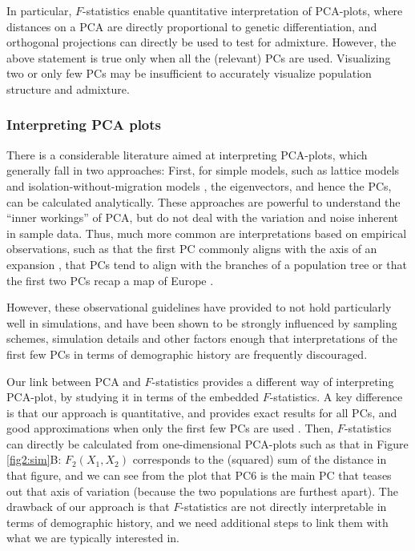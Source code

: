 \documentclass[12pt]{article}
\begin{document}
In particular, $F$-statistics enable quantitative interpretation of PCA-plots, where distances on a PCA are directly proportional to genetic differentiation, and orthogonal projections can directly be used to test for admixture.
However, the above statement is true only when all the (relevant) PCs are used. Visualizing two or only few PCs may be insufficient to accurately visualize population structure and admixture. 

\subsubsection{Interpreting PCA plots}
There is a considerable literature aimed at interpreting PCA-plots, which generally fall in two approaches: First, for simple models, such as lattice models \citep{novembre_interpreting_2008} and isolation-without-migration models \citep{mcvean_genealogical_2009}, the eigenvectors, and hence the PCs, can be calculated analytically. These approaches are powerful to understand the ``inner workings'' of PCA, but do not deal with the variation and noise inherent in sample data. Thus, much more common are interpretations based on empirical observations, such as that the first PC commonly aligns with the axis of an expansion \citep{l_l_cavalli-sforza_history_1996}, that PCs tend to align with the branches of a population tree or that the first two PCs recap a map of Europe \citep{novembre_genes_2008, cavalli-sforza_analysis_1975}.

However, these observational guidelines have provided to not hold particularly well in simulations, and have been shown to be strongly influenced by sampling schemes, simulation details and other factors \citep{novembre_interpreting_2008, degiorgio_geographic_2013, elhaik_principal_2022, jay_anisotropic_2013} enough that interpretations of the first few PCs in terms of demographic history are frequently discouraged.

Our link between PCA and $F$-statistics provides a different way of interpreting PCA-plot, by studying it in terms of the embedded $F$-statistics. A key difference is that our approach is quantitative, and provides exact results for all PCs, and good approximations when only the first few PCs are used \citep{peter_geometric_2022}. Then, $F$-statistics can directly be calculated from one-dimensional PCA-plots such as that in Figure \ref{fig2:sim}B: $F_2(X_1, X_2)$ corresponds to the (squared) sum of the distance in that figure, and we can see from the plot that PC6 is the main PC that teases out that axis of variation (because the two populations are furthest apart).  
The drawback of our approach is that $F$-statistics are not directly interpretable in terms of demographic history, and we need additional steps to link them with what we are typically interested in. 
\end{document}
